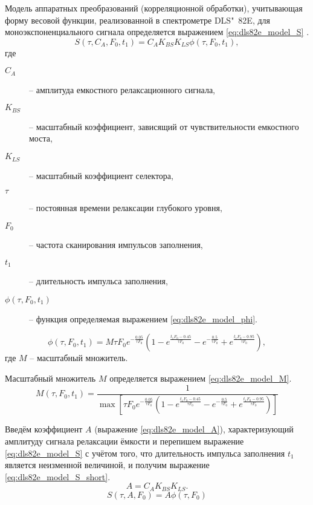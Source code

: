     Модель аппаратных преобразований (корреляционной обработки),
    учитывающая форму весовой функции, реализованной в спектрометре
    DLS"~82E, для моноэкспоненциального сигнала определяется выражением
    \ref{eq:dls82e_model_S} \cite{rp_vak}.
    \begin{equation}
        \label{eq:dls82e_model_S}
        S\left(\tau,C_A,F_0, t_1\right) = C_A K_{BS} K_{LS} 
        \phi\left(\tau,F_0,t_1\right),
    \end{equation}
    где
    \begin{description}
        \item[$C_A$] -- амплитуда емкостного релаксационного сигнала,
        \item[$K_{BS}$] -- масштабный коэффициент, зависящий от 
        чувствительности емкостного моста,
        \item[$K_{LS}$] -- масштабный коэффициент селектора,
        \item[$\tau$] -- постоянная времени релаксации глубокого уровня,
        \item[$F_0$] -- частота сканирования импульсов заполнения,
        \item[$t_1$] -- длительность импульса заполнения,
        \item[$\phi\left(\tau,F_0,t_1\right)$] -- функция определяемая
        выражением \ref{eq:dls82e_model_phi}.
    \end{description}
    \begin{equation}
        \label{eq:dls82e_model_phi}
        \phi\left(\tau,F_0,t_1\right) = 
        M \tau F_0 e^{-\frac{0.05}{\tau F_0}}
        \left(1-e^{\frac{t_1 F_0-0.45}{\tau F_0}}
        -e^{-\frac{0.5}{\tau F_0}}+
        e^{\frac{t_1 F_0-0.95}{\tau F_0}}\right),
    \end{equation}
    где $M$ -- масштабный множитель.

    Масштабный множитель $M$ определяется выражением
    \ref{eq:dls82e_model_M}.
    \begin{equation}
        \label{eq:dls82e_model_M}
        M(\tau, F_0, t_1) = \frac{1}{\max{\left[
        \tau F_0 e^{-\frac{0.05}{\tau F_0}}
        \left(1-e^{\frac{t_1 F_0-0.45}{\tau F_0}}
        -e^{-\frac{0.5}{\tau F_0}}+
        e^{\frac{t_1 F_0-0.95}{\tau F_0}}\right)
        \right]}}
    \end{equation}

    Введём коэффициент $A$ (выражение \ref{eq:dls82e_model_A}), 
    характеризующий амплитуду сигнала релаксации ёмкости и перепишем 
    выражение \ref{eq:dls82e_model_S} с учётом того, что длительность
    импульса заполнения $t_1$ является неизменной величиной, и получим
    выражение \ref{eq:dls82e_model_S_short}.
    \begin{equation}
        \label{eq:dls82e_model_A}
        A = C_A K_{BS} K_{LS}.
    \end{equation}
    \begin{equation}
        \label{eq:dls82e_model_S_short}
        S(\tau,A,F_0) = A\phi(\tau, F_0)
    \end{equation}


